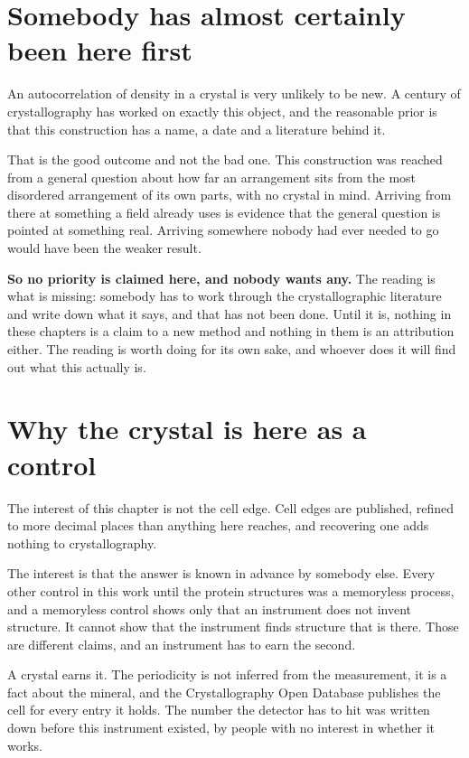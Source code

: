 \section{Somebody has almost certainly been here first}

An autocorrelation of density in a crystal is very unlikely to be new. A century of crystallography has worked on exactly this object, and the reasonable prior is that this construction has a name, a date and a literature behind it.

That is the good outcome and not the bad one. This construction was reached from a general question about how far an arrangement sits from the most disordered arrangement of its own parts, with no crystal in mind. Arriving from there at something a field already uses is evidence that the general question is pointed at something real. Arriving somewhere nobody had ever needed to go would have been the weaker result.

\textbf{So no priority is claimed here, and nobody wants any.} The reading is what is missing: somebody has to work through the crystallographic literature and write down what it says, and that has not been done. Until it is, nothing in these chapters is a claim to a new method and nothing in them is an attribution either. The reading is worth doing for its own sake, and whoever does it will find out what this actually is.

\section{Why the crystal is here as a control}

The interest of this chapter is not the cell edge. Cell edges are published, refined to more decimal places than anything here reaches, and recovering one adds nothing to crystallography.

The interest is that the answer is known in advance by somebody else. Every other control in this work until the protein structures was a memoryless process, and a memoryless control shows only that an instrument does not invent structure. It cannot show that the instrument finds structure that is there. Those are different claims, and an instrument has to earn the second.

A crystal earns it. The periodicity is not inferred from the measurement, it is a fact about the mineral, and the Crystallography Open Database publishes the cell for every entry it holds. The number the detector has to hit was written down before this instrument existed, by people with no interest in whether it works.
